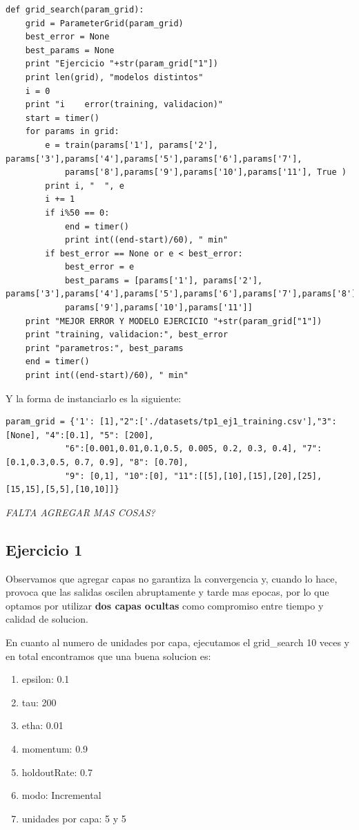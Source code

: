 \begin{lstlisting}[caption=grid\_search]
def grid_search(param_grid):
	grid = ParameterGrid(param_grid)
	best_error = None
	best_params = None
	print "Ejercicio "+str(param_grid["1"])
	print len(grid), "modelos distintos"
	i = 0
	print "i 	error(training, validacion)"
	start = timer()
	for params in grid:
	    e = train(params['1'], params['2'], params['3'],params['4'],params['5'],params['6'],params['7'],
	    	params['8'],params['9'],params['10'],params['11'], True )
	    print i, "	", e
	    i += 1
	    if i%50 == 0:
	    	end = timer()
	    	print int((end-start)/60), " min"
	    if best_error == None or e < best_error:
	    	best_error = e
	    	best_params = [params['1'], params['2'], params['3'],params['4'],params['5'],params['6'],params['7'],params['8'],
	    	params['9'],params['10'],params['11']]
	print "MEJOR ERROR Y MODELO EJERCICIO "+str(param_grid["1"])
	print "training, validacion:", best_error
	print "parametros:", best_params
	end = timer()
	print int((end-start)/60), " min"
\end{lstlisting}

Y la forma de instanciarlo es la siguiente:

\begin{lstlisting}[caption=Instanciacion]
param_grid = {'1': [1],"2":['./datasets/tp1_ej1_training.csv'],"3": [None], "4":[0.1], "5": [200], 
			"6":[0.001,0.01,0.1,0.5, 0.005, 0.2, 0.3, 0.4], "7":[0.1,0.3,0.5, 0.7, 0.9], "8": [0.70], 
			"9": [0,1], "10":[0], "11":[[5],[10],[15],[20],[25],[15,15],[5,5],[10,10]]}
\end{lstlisting}


\emph{\color{red} FALTA AGREGAR MAS COSAS?}
\subsection{Ejercicio 1}

Observamos que agregar capas no garantiza la convergencia y, cuando lo hace, provoca que las salidas oscilen abruptamente y tarde mas epocas, por lo que optamos por utilizar \textbf{dos capas ocultas} como compromiso entre tiempo y calidad de solucion. 


En cuanto al numero de unidades por capa, ejecutamos el grid\_search 10 veces y en total encontramos que una buena solucion es:

\begin{enumerate}
\item epsilon: 0.1
\item tau: 200
\item etha: 0.01
\item momentum: 0.9
\item holdoutRate: 0.7
\item modo: Incremental
\item unidades por capa: 5 y 5
\end{enumerate}

